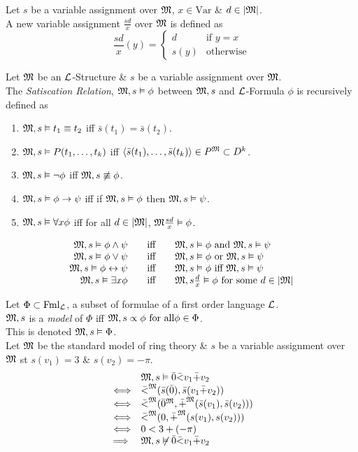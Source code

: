 \documentclass[11pt,a4paper]{article}
\begin{document}
\theorem{}
Let $s$ be a variable assignment over $\mathfrak{M}$, $x\in\text{Var}$ \& $d\in|\mathfrak{M}|$.\\
A new variable assignment $\frac{sd}{x}$ over $\mathfrak{M}$ is defined as
$$\frac{sd}{x}(y)=\begin{cases}d&\text{if }y=x\\s(y)&\text{otherwise}\end{cases}$$

Let $\mathfrak{M}$ be an $\mathcal{L}$-Structure \& $s$ be a variable assignment over $\mathfrak{M}$.\\
The \textit{Satiscation Relation}, $\mathfrak{M},s\vDash\phi$ between $\mathfrak{M},s$ and $\mathcal{L}$-Formula $\phi$ is recursively defined as
\begin{enumerate}
	\item $\mathfrak{M},s\vDash t_1\equiv t_2$ iff $\bar{s}(t_1)=\bar{s}(t_2)$.
	\item $\mathfrak{M},s\vDash P(t_1,\dots,t_k)$ iff $\langle\bar{s}(t_1),\dots,\bar{s}(t_k)\rangle\in P^{\mathfrak{M}}\subset D^k$.
	\item $\mathfrak{M},s\vDash \neg\phi$ iff $\mathfrak{M},s\not\equiv\phi$.
	\item $\mathfrak{M},s\vDash\phi\to\psi$ iff if $\mathfrak{M},s\vDash\phi$ then $\mathfrak{M},s\vDash\psi$.
	\item $\mathfrak{M},s\vDash \forall x\phi$ iff for all $d\in|\mathfrak{M}|$, $\mathfrak{M}\frac{sd}{x}\vDash\phi$.
\end{enumerate}

\[\begin{array}{rcl}
\mathfrak{M},s\vDash\phi\wedge\psi&\quad\text{iff}\quad&\mathfrak{M},s\vDash\phi\text{ and }\mathfrak{M},s\vDash\psi\\
\mathfrak{M},s\vDash\phi\vee\psi&\text{iff}&\mathfrak{M},s\vDash\phi\text{ or }\mathfrak{M},s\vDash\psi\\
\mathfrak{M},s\vDash\phi\leftrightarrow\psi&\quad\text{iff}\quad&\mathfrak{M},s\vDash\phi\text{ iff }\mathfrak{M},s\vDash\psi\\
\mathfrak{M},s\vDash\exists x\phi&\quad\text{iff}\quad&\mathfrak{M},s\frac{d}{x}\vDash\phi\text{ for some }d\in|\mathfrak{M}|
\end{array}\]

Let $\Phi\subset\text{Fml}_{\mathcal{L}}$, a subset of formulae of a first order language $\mathcal{L}$.\\
$\mathfrak{M},s$ is a \textit{model} of $\Phi$ iff $\mathfrak{M},s\propto\phi\text{ for all}\phi\in\Phi$.\\
\nb This is denoted $\mathfrak{M},s\vDash\Phi$.\\

Let $\mathfrak{M}$ be the standard model of ring theory \& $s$ be a variable assignment over $\mathfrak{M}$ st $s(v_1)=3$ \& $s(v_2)=-\pi$.\\
\[\begin{array}{rl}
&\mathfrak{M},s\vDash\bar0\bar< v_1\bar+v_2\\
\Longleftrightarrow&\bar<^{\mathfrak{M}}(\bar{s}(\bar0),\bar{s}(v_1\bar+v_2))\\
\Longleftrightarrow&\bar<^{\mathfrak{M}}(\bar{0}^{\mathfrak{M}},\bar{+}^{\mathfrak{M}}(\bar{s}(v_1),\bar{s}(v_2)))\\
\Longleftrightarrow&\bar<^{\mathfrak{M}}(0,\bar{+}^{\mathfrak{M}}(s(v_1),s(v_2)))\\
\Longleftrightarrow&0<3+(-\pi)\\
\implies&\mathfrak{M},s\not\vDash\bar0\bar< v_1\bar+v_2
\end{array}\]
\end{document}

